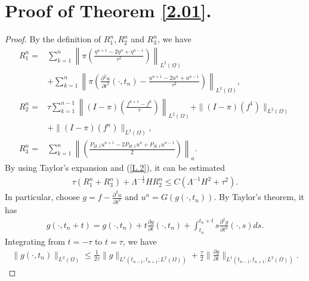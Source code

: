 \documentclass[preprint,12pt]{elsarticle}
\begin{document}
\section{Proof of Theorem \ref{2.01}.}\label{appb}
\begin{proof}
    By the definition of $R^n_1,R^n_2$ and $R^n_3$, we have
\begin{equation}\label{2.3}
\begin{aligned}R_1^n=&\sum_{k=1}^n\left\|\pi\left(\frac{\eta^{n+1}-2\eta^n+\eta^{n-1}}{\tau^2}\right)\right\|_{L^2(\Omega)}\\
     &+\sum_{k=1}^n\left\|\pi\left(\frac{\partial^2u}{\partial t^2}(\cdot,t_n)-\frac{u^{n+1}-2u^n+u^{n-1}}{\tau^2}\right)\right\|_{L^2(\Omega)},\\
     R_2^n=&\tau\sum_{k=1}^{n-1}\left\|(I-\pi)(\frac{f^{k+1}-f^k}{\tau})\right\|_{L^2(\Omega)}+\|(I-\pi)(f^1)\|_{L^2(\Omega)}\\
     &+\|(I-\pi)(f^n)\|_{L^2(\Omega)},\\
     R_3^n=&\sum_{k=1}^n\left\|\left(\frac{P_{H,1}u^{n+1}-2P_{H,1}u^n+P_{H,1}u^{n-1}}{2}\right)\right\|_a.
\end{aligned}
\end{equation}
By using Taylor's expansion and (\ref{L.2}), it can be estimated
\begin{equation}\label{2.32}
\begin{aligned}
     \tau (R_1^n+R_3^n)+\Lambda^{-\frac{1}{2}}HR_2^n\leq C(\Lambda^{-1}H^2+\tau^2).
     \end{aligned}
\end{equation}
In particular, choose $g=f-\frac{\partial^2u}{\partial t^2}$ and $u^n=G(g(\cdot,t_n)).$
By Taylor's theorem, it has
\begin{equation}\label{T1}
\begin{aligned}
     g(\cdot,t_n+t)=g(\cdot,t_n)+t\frac{\partial g}{\partial t}(\cdot,t_n)+\int_{t_n}^{t_n+t}s\frac{\partial^2g}{\partial t^2}(\cdot,s)ds.
\end{aligned}
\end{equation}
Integrating from $t=-\tau$ to $t=\tau$, we have
\begin{equation}\label{T1.1}
\begin{aligned}
     \|g(\cdot,t_n)\|_{L^2(\Omega)}\leq \frac{1}{2\tau}\|g\|_{L^1(t_{n-1},t_{n+1};L^2(\Omega))}+\frac{\tau}{2}\|\frac{\partial g}{\partial t}\|_{L^1(t_{n-1},t_{n+1};L^2(\Omega))}.
\end{aligned}
\end{equation}

\end{proof}
\end{document}
